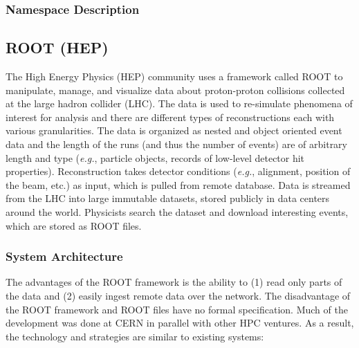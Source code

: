 \subsubsection{Namespace Description}

\subsection{ROOT (HEP)}

The High Energy Physics (HEP) community uses a framework called ROOT to
manipulate, manage, and visualize data about proton-proton collisions
collected at the large hadron collider (LHC). The data is used to re-simulate
phenomena of interest for analysis and there are different types of
reconstructions each with various granularities. The data is organized as
nested and object oriented event data and the length of the runs (and thus
the number of events) are of arbitrary length and type ({\it e.g.},
particle objects, records of low-level detector hit properties).
Reconstruction takes detector conditions ({\it e.g.}, alignment, position of
the beam, etc.) as input, which is pulled from remote database.  Data is
streamed from the LHC into large immutable datasets, stored publicly in
data centers around the world.  Physicists search the dataset and download
interesting events, which are stored as ROOT files. 

\subsubsection{System Architecture}

The advantages of the ROOT framework is the ability to (1) read only parts
of the data and (2) easily ingest remote data over the network. The
disadvantage of the ROOT framework and ROOT files have no formal
specification. Much of the development was done at CERN in parallel with
other HPC ventures. As a result, the technology and strategies are similar
to existing systems:

